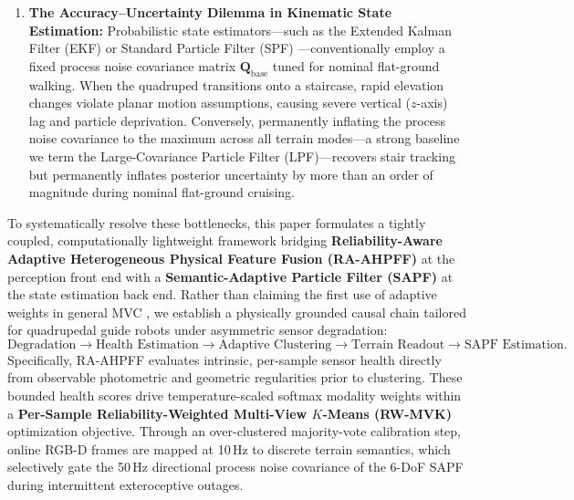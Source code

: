 \documentclass[11pt, a4paper]{article}
\begin{document}
\begin{enumerate}
    \item \textbf{The Accuracy--Uncertainty Dilemma in Kinematic State Estimation:} Probabilistic state estimators—such as the Extended Kalman Filter (EKF) or Standard Particle Filter (SPF) \cite{thrun2005probabilistic}—conventionally employ a fixed process noise covariance matrix $\mathbf{Q}_{\text{base}}$ tuned for nominal flat-ground walking. When the quadruped transitions onto a staircase, rapid elevation changes violate planar motion assumptions, causing severe vertical ($z$-axis) lag and particle deprivation. Conversely, permanently inflating the process noise covariance to the maximum across all terrain modes—a strong baseline we term the Large-Covariance Particle Filter (LPF)—recovers stair tracking but permanently inflates posterior uncertainty by more than an order of magnitude during nominal flat-ground cruising.
\end{enumerate}

To systematically resolve these bottlenecks, this paper formulates a tightly coupled, computationally lightweight framework bridging \textbf{Reliability-Aware Adaptive Heterogeneous Physical Feature Fusion (RA-AHPFF)} at the perception front end with a \textbf{Semantic-Adaptive Particle Filter (SAPF)} at the state estimation back end. Rather than claiming the first use of adaptive weights in general MVC \cite{hu2022view, yang2025deep, he2026adaptive}, we establish a physically grounded causal chain tailored for quadrupedal guide robots under asymmetric sensor degradation:
\begin{equation}
    \text{Degradation} \rightarrow \text{Health Estimation} \rightarrow \text{Adaptive Clustering} \rightarrow \text{Terrain Readout} \rightarrow \text{SAPF Estimation}.
    \label{eq:causal_chain}
\end{equation}
Specifically, RA-AHPFF evaluates intrinsic, per-sample sensor health directly from observable photometric and geometric regularities prior to clustering. These bounded health scores drive temperature-scaled softmax modality weights within a \textbf{Per-Sample Reliability-Weighted Multi-View $K$-Means (RW-MVK)} optimization objective. Through an over-clustered majority-vote calibration step, online RGB-D frames are mapped at 10\,Hz to discrete terrain semantics, which selectively gate the 50\,Hz directional process noise covariance of the 6-DoF SAPF during intermittent exteroceptive outages.
\end{document}

